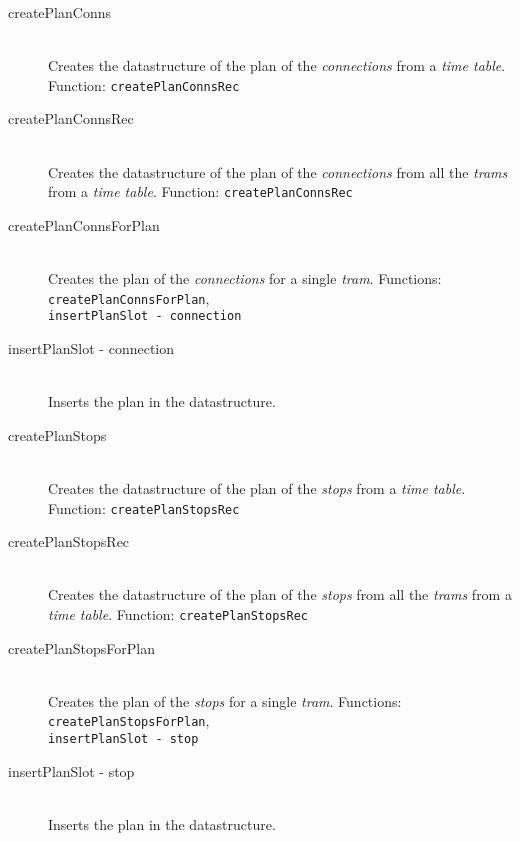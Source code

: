 \documentclass[a4]{article}
\begin{document}
\begin{description}
    \item[createPlanConns] \hfill \\ Creates the datastructure of the plan of the \emph{connections} from a \emph{time table}. Function: \verb=createPlanConnsRec=
    \item[createPlanConnsRec] \hfill \\ Creates the datastructure of the plan of the \emph{connections} from all the \emph{trams} from a \emph{time table}. Function: \verb=createPlanConnsRec=
    \item[createPlanConnsForPlan] \hfill \\ Creates the plan of the \emph{connections} for a single \emph{tram}. Functions: \verb=createPlanConnsForPlan=, \\ \verb=insertPlanSlot - connection=
    \item[insertPlanSlot - connection] \hfill \\ Inserts the plan in the datastructure. 
    \item[createPlanStops] \hfill \\ Creates the datastructure of the plan of the \emph{stops} from a \emph{time table}. Function: \verb=createPlanStopsRec=
    \item[createPlanStopsRec] \hfill \\ Creates the datastructure of the plan of the \emph{stops} from all the \emph{trams} from a \emph{time table}. Function: \verb=createPlanStopsRec=
    \item[createPlanStopsForPlan] \hfill \\ Creates the plan of the \emph{stops} for a single \emph{tram}. Functions: \verb=createPlanStopsForPlan=, \\ \verb=insertPlanSlot - stop=
    \item[insertPlanSlot - stop] \hfill \\ Inserts the plan in the datastructure.
\end{description}
\end{document}

